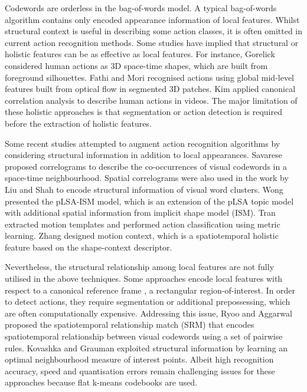 Codewords are orderless in the bag-of-words model. 
A typical bag-of-words algorithm contains only encoded appearance information of local features.  
Whilst structural context is useful in describing some action classes, it is often omitted in current action recognition methods. Some studies have implied that structural or holistic features can be as effective as local features. 
For instance, Gorelick \etal \cite{Gorelick2007} considered human actions as 3D space-time shapes, which are built from foreground silhouettes. Fathi and Mori \cite{Fathi2008} recognised actions using global mid-level features built from optical flow in segmented 3D patches. Kim \etal \cite{Kim2007} applied canonical correlation analysis to describe human actions in videos. The major limitation of these holistic approaches is that segmentation or action detection is required before the extraction of holistic features.  

Some recent studies attempted to augment action recognition algorithms by considering structural information in addition to local appearances. Savarese \etal \cite{Savarese2008} proposed correlograms to describe the co-occurrences of visual codewords in a space-time neighbourhood. Spatial correlograms were also used in the work by Liu and Shah \cite{Liu2008} to encode structural information of visual word clusters. Wong \etal \cite{Wong2007} presented the pLSA-ISM model, which is an extension of the pLSA topic model \cite{Fergus2005} with additional spatial information from implicit shape model (ISM). Tran \etal \cite{Tran2008} extracted motion templates and performed action classification using metric learning. Zhang \etal \cite{Zhang2008} designed motion context, which is a spatiotemporal holistic feature based on the shape-context descriptor.  

Nevertheless, the structural relationship among local features are not fully utilised in the above techniques. Some approaches encode local features with respect to a canonical reference frame \cite{Wong2007, Tran2008, Zhang2008}, \eg a rectangular region-of-interest. In order to detect actions, they require segmentation or additional prepossessing, which are often computationally expensive. Addressing this issue, Ryoo and Aggarwal \cite{Ryoo2009} proposed the spatiotemporal relationship match (SRM) that encodes spatiotemporal relationship between visual codewords using a set of pairwise rules. Kovashka and Grauman \cite{Kovashka2010} exploited structural information by learning an optimal neighbourhood measure of interest points. Albeit high recognition accuracy, speed and quantisation errors remain challenging issues for these approaches because flat k-means codebooks are used.   

